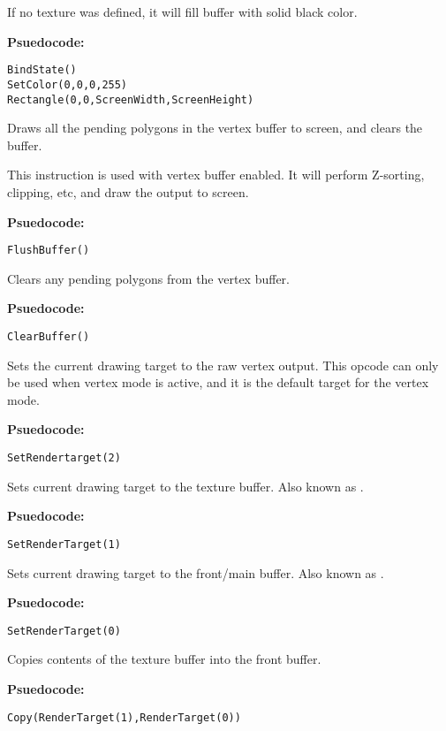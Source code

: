 If no texture was defined, it will fill buffer with solid black color.

\textbf{Psuedocode:}
\begin{verbatim}
BindState()
SetColor(0,0,0,255)
Rectangle(0,0,ScreenWidth,ScreenHeight)
\end{verbatim}


Draws all the pending polygons in the vertex buffer to screen, and clears the buffer.

This instruction is used with vertex buffer enabled. It will perform Z-sorting, clipping, etc, and draw the output to screen.

\textbf{Psuedocode:}
\begin{verbatim}
FlushBuffer()
\end{verbatim}


Clears any pending polygons from the vertex buffer.

\textbf{Psuedocode:}
\begin{verbatim}
ClearBuffer()
\end{verbatim}


Sets the current drawing target to the raw vertex output. This opcode can only be used when vertex mode is active, and it is the default target for the vertex mode.

\textbf{Psuedocode:}
\begin{verbatim}
SetRendertarget(2)
\end{verbatim}


Sets current drawing target to the texture buffer. Also known as .

\textbf{Psuedocode:}
\begin{verbatim}
SetRenderTarget(1)
\end{verbatim}


Sets current drawing target to the front/main buffer. Also known as .

\textbf{Psuedocode:}
\begin{verbatim}
SetRenderTarget(0)
\end{verbatim}


Copies contents of the texture buffer into the front buffer.

\textbf{Psuedocode:}
\begin{verbatim}
Copy(RenderTarget(1),RenderTarget(0))
\end{verbatim}



